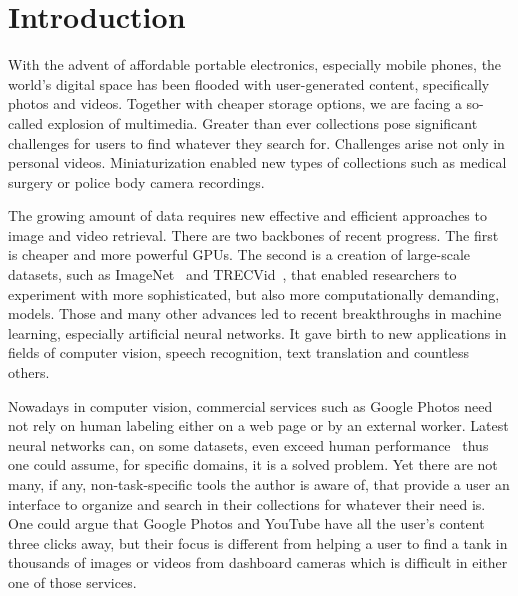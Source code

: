 \chapter*{Introduction}


With the advent of affordable portable electronics, especially mobile phones, the world's digital space has been flooded with user-generated content, specifically photos and videos. Together with cheaper storage options, we are facing a so-called explosion of multimedia. Greater than ever collections pose significant challenges for users to find whatever they search for. Challenges arise not only in personal videos. Miniaturization enabled new types of collections such as medical surgery or police body camera recordings.

The growing amount of data requires new effective and efficient approaches to image and video retrieval. There are two backbones of recent progress. The first is cheaper and more powerful GPUs. The second is a creation of large-scale datasets, such as ImageNet~\cite{ILSVRC15} and TRECVid~\cite{2017trecvidawad}, that enabled researchers to experiment with more sophisticated, but also more computationally demanding, models. Those and many other advances led to recent breakthroughs in machine learning, especially artificial neural networks. It gave birth to new applications in fields of computer vision, speech recognition, text translation and countless others.

Nowadays in computer vision, commercial services such as Google Photos need not rely on human labeling either on a web page or by an external worker. Latest neural networks can, on some datasets, even exceed human performance~\cite{he2015delving} thus one could assume, for specific domains, it is a solved problem. Yet there are not many, if any, non-task-specific tools the author is aware of, that provide a user an interface to organize and search in their collections for whatever their need is. One could argue that Google Photos and YouTube have all the user's content three clicks away, but their focus is different from helping a user to find a tank in thousands of images or videos from dashboard cameras which is difficult in either one of those services.

